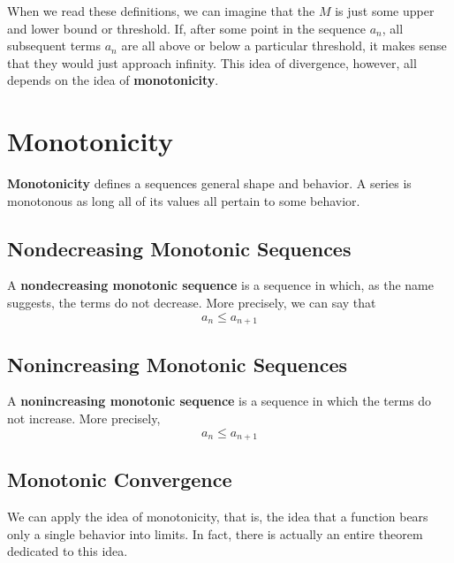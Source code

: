 \documentclass{report}
\newtheorem{thm}{Theorem}
\begin{document}
\begin{sloppypar}
When we read these definitions, we can imagine that the $ M $ is just some upper and lower bound or threshold. If, after
some point in the sequence $ a_{n} $, all subsequent terms $ a_{n} $ are all above or below a particular threshold, it makes
sense that they would just approach infinity. This idea of divergence, however, all depends on the idea of
\textbf{monotonicity}.

\section{Monotonicity}
\textbf{Monotonicity} defines a sequences general shape and behavior. A series is monotonous as long all of its values
all pertain to some behavior.
\\
\subsection{Nondecreasing Monotonic Sequences}
A \textbf{nondecreasing monotonic sequence} is a sequence in which, as the name suggests, the terms do not decrease.
More precisely, we can say that
\[ a_{n} \leq a_{n+1} \]
\subsection{Nonincreasing Monotonic Sequences}
A \textbf{nonincreasing monotonic sequence} is a sequence in which the terms do not increase. More precisely,
\[ a_{n} \leq a_{n+1} \]

\subsection{Monotonic Convergence}
We can apply the idea of monotonicity, that is, the idea that a function bears only a single behavior into limits. In fact,
there is actually an entire theorem dedicated to this idea.

\begin{center}
\end{center}


\end{sloppypar}
\end{document}
